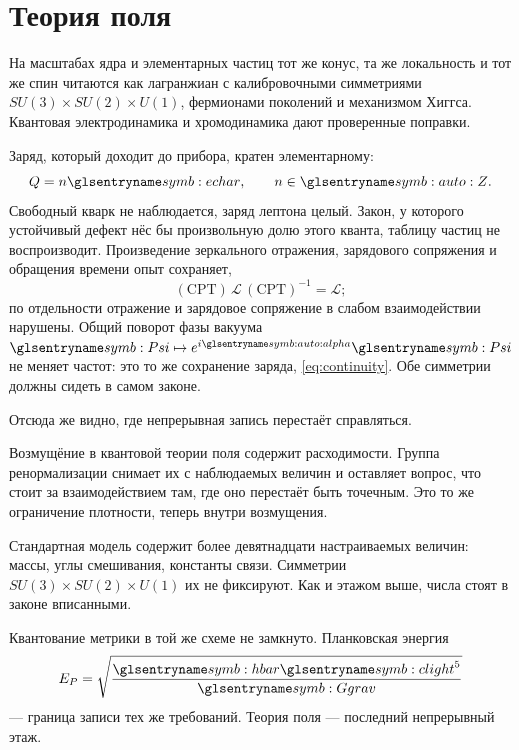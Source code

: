 \section{Теория поля}
\label{sec:qft-open}

На масштабах ядра и элементарных частиц тот же конус, та же локальность и тот же спин
читаются как лагранжиан с калибровочными симметриями $SU(3)\times SU(2)\times U(1)$,
фермионами поколений и механизмом Хиггса.
Квантовая электродинамика и хромодинамика дают проверенные поправки.

Заряд, который доходит до прибора, кратен элементарному:
\begin{equation}
  Q = n \chargeE, \qquad n\in\spaceZ.
  \label{eq:charge-quantum}
\end{equation}
Свободный кварк не наблюдается, заряд лептона целый.
Закон, у которого устойчивый дефект нёс бы произвольную долю этого кванта,
таблицу частиц не воспроизводит.
Произведение зеркального отражения, зарядового сопряжения и обращения времени опыт сохраняет,
\begin{equation}
  (\mathrm{CPT})\,\mathcal{L}\,(\mathrm{CPT})^{-1} = \mathcal{L};
  \label{eq:cpt}
\end{equation}
по отдельности отражение и зарядовое сопряжение в слабом взаимодействии нарушены.
Общий поворот фазы вакуума $\wavePsi\mapsto e^{i\symAlpha}\wavePsi$ не меняет частот:
это то же сохранение заряда, \eqref{eq:continuity}.
Обе симметрии должны сидеть в самом законе.

Отсюда же видно, где непрерывная запись перестаёт справляться.

Возмущёние в квантовой теории поля содержит расходимости.
Группа ренормализации снимает их с наблюдаемых величин
и оставляет вопрос, что стоит за взаимодействием там,
где оно перестаёт быть точечным.
Это то же ограничение плотности, теперь внутри возмущения.

Стандартная модель содержит более девятнадцати настраиваемых величин:
массы, углы смешивания, константы связи.
Симметрии $SU(3)\times SU(2)\times U(1)$ их не фиксируют.
Как и этажом выше, числа стоят в законе вписанными.

Квантование метрики в той же схеме не замкнуто.
Планковская энергия
\begin{equation}
  E_P = \sqrt{\frac{\planckHbar \speedC^5}{\constGrav}}
  \label{eq:planck-energy}
\end{equation}
--- граница записи тех же требований.
Теория поля --- последний непрерывный этаж.

